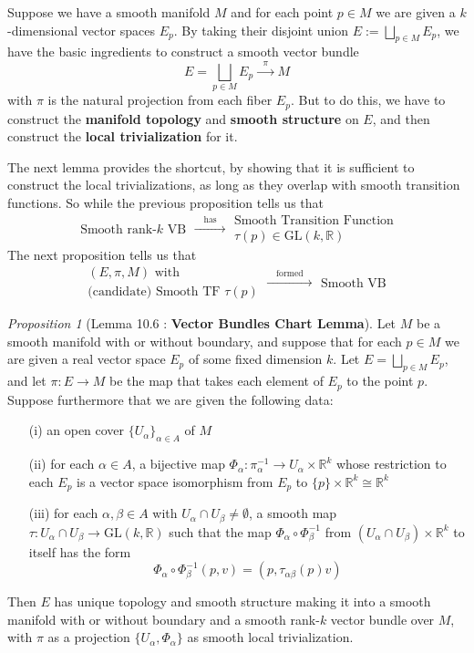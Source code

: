 \documentclass[a4paper]{article}
\theoremstyle{remark}
\newtheorem{prop}{Proposition}
\newcommand{\er}{\mathbb{R}} %
\newcommand{\rk}{\mathbb{R}^k} %
\newcommand{\GLsaja}{\text{GL}} %
\newcommand{\isomorphic}{\cong} %
\newcommand{\Ualpha}{U_{\alpha}} %
\newcommand{\Ubeta}{U_{\beta}} %
\newcommand{\alfa}{\alpha}  %
\begin{document}
Suppose we have a smooth manifold $M$ and for each  point  $p\in M$ we are given a $k$-dimensional vector spaces $E_p$. By taking their disjoint union $E := \bigsqcup_{p\in M} E_p$, we have the basic ingredients to construct a smooth vector bundle
$$
E =  \bigsqcup_{p\in M} E_p \xrightarrow{\text{ }\pi \text{ } } M
$$
with $\pi$ is the natural projection from each fiber $E_p$. But to do this, we have to construct the \textbf{manifold topology} and \textbf{smooth structure} on $E$, and then construct the \textbf{local trivialization} for it. 

The next lemma provides the shortcut, by showing that it is sufficient to construct the local trivializations, as long as they overlap with smooth transition functions. So while the previous proposition tells us that
$$
\begin{matrix}
\text{Smooth rank-$k$ VB} 
\end{matrix} \xrightarrow{\quad\text{has}\quad }
\begin{matrix}
\text{Smooth Transition Function} \\
\tau(p) \in \GLsaja(k,\er)
\end{matrix}
$$ 
The next proposition tells us that
$$
\begin{matrix}
(E,\pi,M) \text{ with} \\
\text{(candidate) Smooth TF } \tau(p)
\end{matrix} \xrightarrow{\quad \text{formed} \quad }
\begin{matrix}
\text{Smooth VB}
\end{matrix}
$$ 
\begin{prop}[Lemma 10.6 : \textbf{Vector Bundles Chart Lemma}]
Let $M$ be a smooth manifold with or without boundary, and suppose that for each $p \in M$ we are given a real vector space $E_p$ of some fixed dimension $k$. Let $E = \bigsqcup_{p\in M} E_p$, and let $\pi : E \to M$ be the map that takes each element of $E_p$ to the point $p$. Suppose furthermore that we are given the following data:
\begin{enumerate}[nolistsep]
\item[(i)] an open cover $\{U_{\alfa}\}_{\alfa \in A}$ of $M$
\item[(ii)] for each $\alpha \in A$, a bijective map $\Phi_{\alpha} : \pi^{-1}_{\alfa} \to U_{\alfa} \times \rk $ whose restriction to each $E_p$ is a vector space isomorphism from $E_p$ to $\{p\} \times \rk \isomorphic \rk$
\item[(iii)] for each $\alfa, \beta \in A$ with $U_{\alfa} \cap U_{\beta} \neq \emptyset$, a smooth map $\tau : \Ualpha \cap \Ubeta \to \GLsaja(k,\er)$ such that the map $\Phi_{\alfa} \circ \Phi_{\beta}^{-1} $ from $(\Ualpha \cap\Ubeta)\times \rk$ to itself has the form 
$$
\Phi_{\alfa} \circ \Phi_{\beta}^{-1} (p,v) = (p,\tau_{\alfa\beta}(p) v)
$$
\end{enumerate}
Then $E$ has unique topology and smooth structure making it into a smooth manifold with or without boundary and a smooth rank-$k$ vector bundle over $M$, with $\pi$ as a projection $\{\Ualpha, \Phi_{\alfa}\}$ as smooth local trivialization.
\end{prop}
\end{document}
